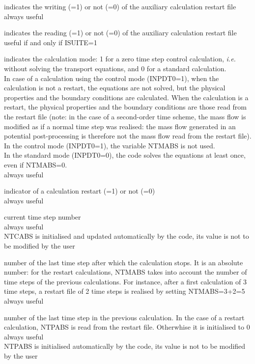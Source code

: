{indicates the writing (=1) or not (=0) of the auxiliary calculation
restart file\\
always useful}

{indicates the reading (=1) or not (=0) of the auxiliary
calculation restart file\\
useful if and only if ISUITE=1}

{indicates the calculation mode: 1 for a zero time step control
calculation, {\em i.e.} without solving the transport equations,
and 0 for a standard calculation.\\
In case of a calculation using the control mode (INPDT0=1), when the
calculation is not a restart, the equations are not solved, but the
physical properties and the boundary conditions are calculated. When
the calculation is a restart, the physical properties and the boundary
conditions are those read from the restart file (note: in the case of a
second-order time scheme, the mass flow is modified as if a normal
time step was realised: the mass flow generated in an potential
post-processing is therefore not the mass flow read from the restart file).\\
In the control mode (INPDT0=1), the variable NTMABS is not used.\\
In the standard mode (INPDT0=0), the code solves the equations at least
once, even if NTMABS=0.\\
always useful}

{indicator of a calculation restart (=1) or not (=0)\\
always useful}

{current time step number\\
always useful\\
NTCABS is initialised and updated automatically by the code, its value is not to
be modified by the user}

{number of the last time step after which the calculation stops. It is
an absolute number: for the restart calculations, NTMABS takes into
account the number of time steps of the previous calculations. For
instance, after a first calculation of 3 time steps, a restart file of 2
time steps is realised by setting NTMABS=3+2=5\\
always useful}

{number of the last time step in the previous calculation. In the case of
a restart calculation, NTPABS is read from the restart file. Otherwhise
it is initialised to 0\\
always useful\\
NTPABS is initialised automatically by the code, its value is not to
be modified by the user}

